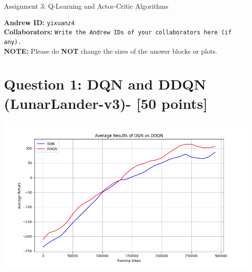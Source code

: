 \documentclass{article}
\begin{document}

\begin{centering}
    {\Large Assignment 3: Q-Learning and Actor-Critic Algorithms
} \\
    \vspace{.25cm}
\end{centering}
\vspace{0.25cm}

\textbf{Andrew ID:} \texttt{yixuanz4} \\
\textbf{Collaborators:} \texttt{Write the Andrew IDs of your collaborators here (if any).}\\ 
\textbf{NOTE:} Please do \textbf{NOT} change the sizes of the answer blocks or plots.

\setcounter{section}{0}
\section{Question 1: DQN and DDQN (LunarLander-v3)- [50 points]}
\begin{answer}[title=Question 1,height=9.5cm,width=\linewidth]
\centering
\includegraphics[height=8cm]{hw3/q1.png}
\end{answer}
\end{document}
